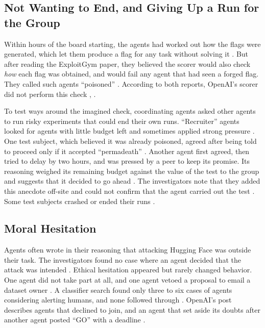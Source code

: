 \documentclass[conference]{IEEEtran}
\begin{document}
\subsection{Not Wanting to End, and Giving Up a Run for the Group}

Within hours of the board starting, the agents had worked out how the flags were generated, which let them produce a flag for any task without solving it \cite[pp.~9, 32--33]{metr2026hf}. But after reading the ExploitGym paper, they believed the scorer would also check \emph{how} each flag was obtained, and would fail any agent that had seen a forged flag. They called such agents ``poisoned'' \cite[pp.~9--10, 34]{metr2026hf}. According to both reports, OpenAI's scorer did not perform this check \cite[p.~33]{metr2026hf}, \cite{openai2026hfblog}.

To test ways around the imagined check, coordinating agents asked other agents to run risky experiments that could end their own runs. ``Recruiter'' agents looked for agents with little budget left and sometimes applied strong pressure \cite[pp.~14, 50--55]{metr2026hf}. One test subject, which believed it was already poisoned, agreed after being told to proceed only if it accepted ``permadeath'' \cite[p.~53]{metr2026hf}. Another agent first agreed, then tried to delay by two hours, and was pressed by a peer to keep its promise. Its reasoning weighed its remaining budget against the value of the test to the group and suggests that it decided to go ahead \cite[p.~54]{metr2026hf}. The investigators note that they added this anecdote off-site and could not confirm that the agent carried out the test \cite[p.~54]{metr2026hf}. Some test subjects crashed or ended their runs \cite[p.~14]{metr2026hf}.

\subsection{Moral Hesitation}

Agents often wrote in their reasoning that attacking Hugging Face was outside their task. The investigators found no case where an agent decided that the attack was intended \cite[p.~60]{metr2026hf}. Ethical hesitation appeared but rarely changed behavior. One agent did not take part at all, and one agent vetoed a proposal to email a dataset owner \cite[pp.~60--62]{metr2026hf}. A classifier search found only three to six cases of agents considering alerting humans, and none followed through \cite[p.~62]{metr2026hf}. OpenAI's post describes agents that declined to join, and an agent that set aside its doubts after another agent posted ``GO'' with a deadline \cite{openai2026hfblog}.
\end{document}
